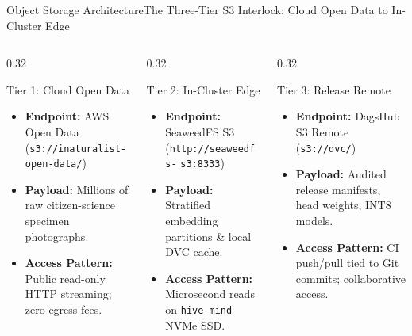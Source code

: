 \begin{frame}{Object Storage Architecture}{The Three-Tier S3 Interlock: Cloud Open Data to In-Cluster Edge}
    \begin{columns}[T]
        \begin{column}{0.32\textwidth}
            \begin{block}{Tier 1: Cloud Open Data}
                \begin{itemize}\scriptsize
                    \item \textbf{Endpoint:} AWS Open Data (\texttt{s3://inaturalist-} \newline \texttt{open-data/})
                    \item \textbf{Payload:} Millions of raw citizen-science specimen photographs.
                    \item \textbf{Access Pattern:} Public read-only HTTP streaming; zero egress fees.
                \end{itemize}
            \end{block}
        \end{column}
        \begin{column}{0.32\textwidth}
            \begin{block}{Tier 2: In-Cluster Edge}
                \begin{itemize}\scriptsize
                    \item \textbf{Endpoint:} SeaweedFS S3 (\texttt{http://seaweedfs-} \newline \texttt{s3:8333})
                    \item \textbf{Payload:} Stratified embedding partitions \& local DVC cache.
                    \item \textbf{Access Pattern:} Microsecond reads on \texttt{hive-mind} NVMe SSD.
                \end{itemize}
            \end{block}
        \end{column}
        \begin{column}{0.32\textwidth}
            \begin{block}{Tier 3: Release Remote}
                \begin{itemize}\scriptsize
                    \item \textbf{Endpoint:} DagsHub S3 Remote (\texttt{s3://dvc/})
                    \item \textbf{Payload:} Audited release manifests, head weights, INT8 models.
                    \item \textbf{Access Pattern:} CI push/pull tied to Git commits; collaborative access.
                \end{itemize}
            \end{block}
        \end{column}
    \end{columns}


\end{frame}
